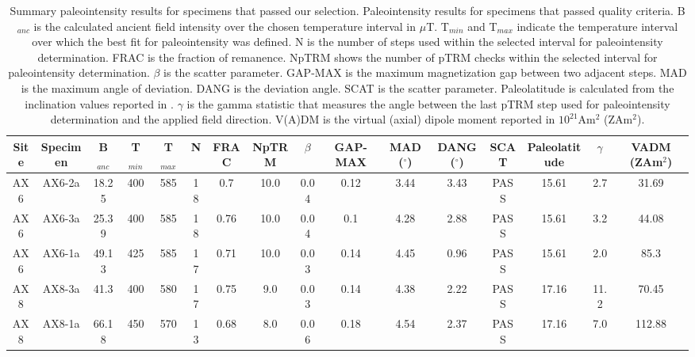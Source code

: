 \documentclass[9pt,twoside,lineno]{pnas-new}
\begin{document}
\clearpage


\begin{table}
\caption{\footnotesize{Summary paleointensity results for specimens that passed our selection. Paleointensity results for specimens that passed quality criteria. B$_{anc}$ is the calculated ancient field intensity over the chosen temperature interval in $\mu$T. T$_{min}$ and T$_{max}$ indicate the temperature interval over which the best fit for paleointensity was defined. N is the number of steps used within the selected interval for paleointensity determination. FRAC is the fraction of remanence. NpTRM shows the number of pTRM checks within the selected interval for paleointensity determination. $\beta$ is the scatter parameter.  GAP-MAX is the maximum magnetization gap between two adjacent steps. MAD is the maximum angle of deviation. DANG is the deviation angle. SCAT is the scatter parameter. Paleolatitude is calculated from the inclination values reported in \cite{Zhang2021b}. $\gamma$ is the gamma statistic that measures the angle between the last pTRM step used for paleointensity determination and the applied field direction. V(A)DM is the virtual (axial) dipole moment reported in $10^{21}$Am$^2$ (ZAm$^2$). }}
\centering
\begin{tabular}{cccccccccccccccc}
\hline
Site & Specimen & B$_{anc}$ & T$_{min}$ & T$_{max}$ & N    & FRAC & NpTRM & $\beta$ & GAP-MAX & MAD ($^\circ$) & DANG ($^\circ$) & SCAT & Paleolatitude & $\gamma$ & VADM (ZAm$^2$) \\
\hline
AX6  & AX6-2a   & 18.25     & 400       & 585       & 18 & 0.7  & 10.0  & 0.04    & 0.12    & 3.44           & 3.43            & PASS & 15.61         & 2.7      & 31.69          \\
AX6  & AX6-3a   & 25.39     & 400       & 585       & 18 & 0.76 & 10.0  & 0.04    & 0.1     & 4.28           & 2.88            & PASS & 15.61         & 3.2      & 44.08          \\
AX6  & AX6-1a   & 49.13     & 425       & 585       & 17 & 0.71 & 10.0  & 0.03    & 0.14    & 4.45           & 0.96            & PASS & 15.61         & 2.0      & 85.3           \\
AX8  & AX8-3a   & 41.3      & 400       & 580       & 17 & 0.75 & 9.0   & 0.03    & 0.14    & 4.38           & 2.22            & PASS & 17.16         & 11.2     & 70.45          \\
AX8  & AX8-1a   & 66.18     & 450       & 570       & 13 & 0.68 & 8.0   & 0.06    & 0.18    & 4.54           & 2.37            & PASS & 17.16         & 7.0      & 112.88         \\

\end{tabular}
\end{table}
\end{document}
